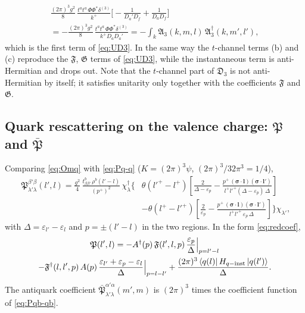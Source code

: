 \documentclass[11pt,a4paper]{article}
\numberwithin{equation}{section}
\newcommand{\mf}[1]{\mathfrak{#1}}
\newcommand{\eps}{\varepsilon}
\newcommand{\dg}{\dagger}
\newcommand{\dthree}{\delta^{(3)}}
\newcommand{\ket}[1]{\left|#1\right\rangle}
\newcommand{\bra}[1]{\left\langle#1\right|}
\newcommand{\Ph}{\Phi}
\begin{document}
\begin{multline}
\frac{(2\pi)^{3}g^{2}}{8}\,\frac{t^{a}t^{a}\,\Ph\Ph^{*}\dthree}{k^{+}}\Big[-\frac{1}{D_{a}'D_{f}}+\frac{1}{D_{a}D_{f}}\Big]
\\=-\frac{(2\pi)^{3}g^{2}}{8}\,\frac{t^{a}t^{a}\,\Ph\Ph^{*}\dthree}{k^{+}D_{a}D_{a}'}
=-\int_{k}\mf A_{3}(k,m,l)\,\mf A_{3}^{\dg}(k,m',l'),
\end{multline}
which is the first term of \eqref{eq:UD3}. In the same way the $t$-channel terms (b) and (c)
reproduce the $\mf F$, $\mf G$ terms of \eqref{eq:UD3}, while the instantaneous term is anti-Hermitian
and drops out. Note that the $t$-channel part of $\mf D_{3}$ is not anti-Hermitian by itself; it
satisfies unitarity only together with the coefficients $\mf F$ and $\mf G$.

\subsection{Quark rescattering on the valence charge: $\mf P$ and $\bar{\mf P}$}

Comparing \eqref{eq:Omq} with \eqref{eq:Pq-q} ($K=(2\pi)^{3}\psi$, $(2\pi)^{3}/32\pi^{3}=1/4$),
\begin{equation}
\boxed{\;
\begin{aligned}
\mf P^{\beta'\beta}_{\lambda'\lambda}(l',l)=\frac{g^{2}}{4}\,\frac{t^{b}_{\beta\beta'}\,\rho^{b}(l'-l)}{(p^{+})^{2}}\,
\chi^{\dg}_{\lambda}\Bigg\{&\theta(l'^{+}-l^{+})\left[\frac{2}{\Delta-\eps_{p}}
-\frac{p^{+}\,(\bm\sigma\!\cdot\!\bm l)(\bm\sigma\!\cdot\!\bm l')}{l^{+}l'^{+}(\Delta-\eps_{p})\,\Delta}\right]
\\
&-\theta(l^{+}-l'^{+})\left[\frac{2}{\eps_{p}}
-\frac{p^{+}\,(\bm\sigma\!\cdot\!\bm l)(\bm\sigma\!\cdot\!\bm l')}{l^{+}l'^{+}\,\eps_{p}\,\Delta}\right]\Bigg\}\chi_{\lambda'},
\end{aligned}}
\label{eq:P}
\end{equation}
with $\Delta=\eps_{l'}-\eps_{l}$ and $p=\pm(l'-l)$ in the two regions. In the form \eqref{eq:redcoef},
\begin{multline}
\mf P(l',l)=-A^{\dg}(p)\,\mf F(l',l,p)\,\frac{\eps_{p}}{\Delta}\Big|_{p=l'-l}
\\-\mf F^{\dg}(l,l',p)\,A(p)\,\frac{\eps_{l'}+\eps_{p}-\eps_{l}}{\Delta}\Big|_{p=l-l'}
+\frac{(2\pi)^{3}\bra{q(l)}H_{q-{\rm inst}}\ket{q(l')}}{\Delta} .
\label{eq:Pred}
\end{multline}
The antiquark coefficient $\bar{\mf P}^{\alpha'\alpha}_{\lambda'\lambda}(m',m)$ is $(2\pi)^{3}$ times the
coefficient function of \eqref{eq:Pqb-qb}.
\end{document}
